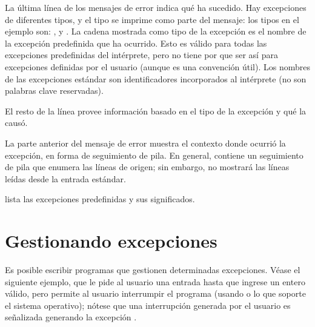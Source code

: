 \documentclass[a5paper,10pt,spanish]{sphinxmanual}
\begin{document}
\sphinxAtStartPar
La última línea de los mensajes de error indica qué ha sucedido.  Hay excepciones de diferentes tipos, y el tipo se imprime como parte del mensaje: los tipos en el ejemplo son: ,  y .  La cadena mostrada como tipo de la excepción es el nombre de la excepción predefinida que ha ocurrido.  Esto es válido para todas las excepciones predefinidas del intérprete, pero no tiene por que ser así para excepciones definidas por el usuario (aunque es una convención útil).  Los nombres de las excepciones estándar son identificadores incorporados al intérprete (no son palabras clave reservadas).

\sphinxAtStartPar
El resto de la línea provee información basado en el tipo de la excepción y qué la causó.

\sphinxAtStartPar
La parte anterior del mensaje de error muestra el contexto donde ocurrió la excepción, en forma de seguimiento de pila. En general, contiene un seguimiento de pila que enumera las líneas de origen; sin embargo, no mostrará las líneas leídas desde la entrada estándar.

\sphinxAtStartPar
{} lista las excepciones predefinidas y sus significados.


\section{Gestionando excepciones}
\label{\detokenize{tutorial/errors:handling-exceptions}}\label{\detokenize{tutorial/errors:tut-handling}}
\sphinxAtStartPar
Es posible escribir programas que gestionen determinadas excepciones.  Véase el siguiente ejemplo, que le pide al usuario una entrada hasta que ingrese un entero válido, pero permite al usuario interrumpir el programa (usando  o lo que soporte el sistema operativo); nótese que una interrupción generada por el usuario es señalizada generando la excepción .

\begin{sphinxVerbatim}[commandchars=\\\{\}]
 
    
          
        
     
        
\end{sphinxVerbatim}
\end{document}
